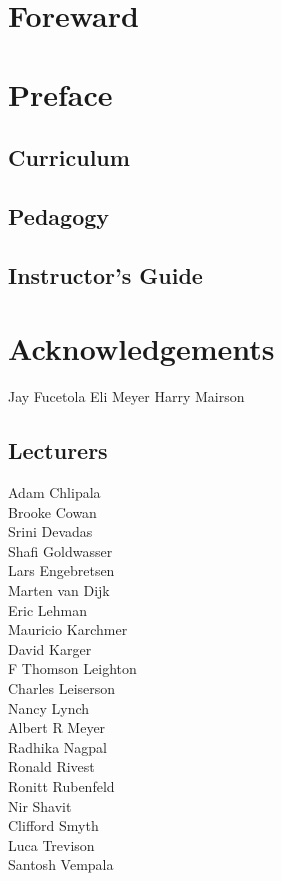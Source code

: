 \chapter*{Foreward}

\chapter*{Preface}


\section*{Curriculum}

\section*{Pedagogy}

\section*{Instructor's Guide}

\chapter*{Acknowledgements}

Jay Fucetola
Eli Meyer
Harry Mairson

\section*{Lecturers}

Adam Chlipala\\
Brooke Cowan\\
Srini Devadas\\
Shafi Goldwasser\\
Lars Engebretsen\\
Marten van Dijk\\
Eric Lehman\\
Mauricio Karchmer\\
David Karger\\
F Thomson Leighton\\
Charles Leiserson\\
Nancy Lynch\\
Albert R Meyer\\
Radhika Nagpal\\
Ronald Rivest\\
Ronitt Rubenfeld\\
Nir Shavit\\
Clifford Smyth\\
Luca Trevison\\
Santosh Vempala

